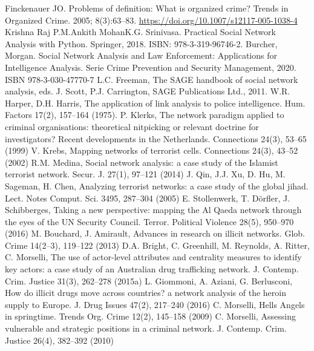 \documentclass[runningheads]{llncs}
\begin{document}
\renewcommand{\refname}{Referencias Bibliográficas}
\begin{thebibliography}{8}
	Finckenauer JO. Problems of definition: What is organized crime? Trends in Organized Crime. 2005; 8(3):63–83. \url{https://doi.org/10.1007/s12117-005-1038-4}
	Krishna Raj P.M.Ankith MohanK.G. Srinivasa. Practical Social Network Analysis with Python. Springer, 2018. ISBN: 978-3-319-96746-2.
	Burcher, Morgan. Social Network Analysis and Law Enforcement: Applications for Intelligence Analysis. Serie Crime Prevention and Security Management, 2020. ISBN 978-3-030-47770-7
	L.C. Freeman, The SAGE handbook of social network analysis, eds. J. Scott, P.J. Carrington, SAGE Publications Ltd., 2011.
	W.R. Harper, D.H. Harris, The application of link analysis to police intelligence. Hum. Factors 17(2), 157–164 (1975).
	P. Klerks, The network paradigm applied to criminal organisations: theoretical nitpicking or relevant doctrine for investigators? Recent developments in the Netherlands. Connections 24(3), 53–65 (1999)
	V. Krebs, Mapping networks of terrorist cells. Connections 24(3), 43–52 (2002)
	R.M. Medina, Social network analysis: a case study of the Islamist terrorist network. Secur. J. 27(1), 97–121 (2014)
	J. Qin, J.J. Xu, D. Hu, M. Sageman, H. Chen, Analyzing terrorist networks: a case study of the global jihad. Lect. Notes Comput. Sci. 3495, 287–304 (2005)
	E. Stollenwerk, T. Dörfler, J. Schibberges, Taking a new perspective: mapping the Al Qaeda network through the eyes of the UN Security Council. Terror. Political Violence 28(5), 950–970  (2016)
	M. Bouchard, J. Amirault, Advances in research on illicit networks. Glob. Crime 14(2–3), 119–122 (2013)
	D.A. Bright, C. Greenhill, M. Reynolds, A. Ritter, C. Morselli, The use of actor-level attributes and centrality measures to identify key actors: a case study of an Australian drug trafficking network. J. Contemp. Crim. Justice 31(3), 262–278 (2015a)
	L. Giommoni, A. Aziani, G. Berlusconi, How do illicit drugs move across countries? a network analysis of the heroin supply to Europe. J. Drug Issues 47(2), 217–240 (2016)
	C. Morselli, Hells Angels in springtime. Trends Org. Crime 12(2), 145–158 (2009)
	C. Morselli, Assessing vulnerable and strategic positions in a criminal network. J. Contemp. Crim. Justice 26(4), 382–392 (2010)

\end{thebibliography}
\end{document}
